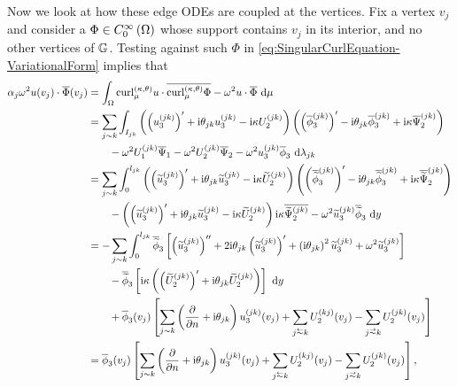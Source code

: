 Now we look at how these edge ODEs are coupled at the vertices.
Fix a vertex $v_j$ and consider a $\Phi\in C^{\infty}_{0}\left( \Omega \right)$ whose support contains $v_j$ in its interior, and no other vertices of $\mathbb{G}$.
Testing against such $\Phi$ in \eqref{eq:SingularCurlEquation-VariationalForm} implies that
\begin{align*}
	\alpha_j\omega^2 u(v_j)\cdot\overline{\Phi}(v_j)
	&= \integral{\ddom}{ \ktcurl{\ddmes}u\cdot\overline{\ktcurl{\ddmes}\Phi} - \omega^2 u\cdot\overline{\Phi} }{\ddmes} \\
	&= \sum_{j\con k}\integral{I_{jk}}{ \bracs{ \bracs{u_3^{(jk)}}' + \rmi\qm_{jk}u_3^{(jk)} - \rmi\wavenumber U_2^{(jk)}} \bracs{ \bracs{\overline{\phi}_3^{(jk)}}' - \rmi\qm_{jk}\overline{\phi}_3^{(jk)} + \rmi\wavenumber \overline{\Psi}_2^{(jk)}} \\
	&\qquad - \omega^2 U_1^{(jk)}\overline{\Psi}_1 - \omega^2 U_2^{(jk)}\overline{\Psi}_2 - \omega^2 u_3^{(jk)}\overline{\phi}_3 }{\lambda_{jk}} \\
	&= \sum_{j\con k}\int_0^{l_{jk}} \bracs{ \bracs{\widetilde{u}_3^{(jk)}}' + \rmi\qm_{jk}\widetilde{u}_3^{(jk)} - \rmi\wavenumber \widetilde{U}_2^{(jk)}} \bracs{ \bracs{\overline{\widetilde{\phi}}_3^{(jk)}}' - \rmi\qm_{jk}\overline{\widetilde{\phi}}_3^{(jk)} + \rmi\wavenumber \overline{\widetilde{\Psi}}_2^{(jk)}} \\
	&\qquad - \bracs{\bracs{\widetilde{u}_3^{(jk)}}' + \rmi\qm_{jk}\widetilde{u}_3^{(jk)} - \rmi\wavenumber \widetilde{U}_2^{(jk)}}\rmi\wavenumber\overline{\widetilde{\Psi}_2^{(jk)}} - \omega^2 \widetilde{u}_3^{(jk)}\overline{\widetilde{\phi}}_3 \ \md y \\
	&= -\sum_{j\con k}\int_0^{l_{jk}} \overline{\widetilde{\phi}}_3
	\sqbracs{ \bracs{\widetilde{u}_3^{(jk)}}'' + 2\rmi\qm_{jk}\bracs{\widetilde{u}_3^{(jk)}}' + \bracs{\rmi\qm_{jk}}^2\widetilde{u}_3^{(jk)} + \omega^2\widetilde{u}_3^{(jk)} } \\
	&\qquad - \overline{\widetilde{\phi}}_3\sqbracs{\rmi\wavenumber\bracs{ \bracs{\widetilde{U}_2^{(jk)}}' + \rmi\qm_{jk}\widetilde{U}_2^{(jk)} } } \ \md y \\
	&\qquad + \overline{\phi}_3(v_j)\sqbracs{ \sum_{j\con k}\bracs{\pdiff{}{n}+\rmi\qm_{jk}}u_3^{(jk)}(v_j) + \sum_{j\conRight k}U_2^{(kj)}(v_j) - \sum_{j\conLeft k}U_2^{(jk)}(v_j) } \\
	&= \overline{\phi}_3(v_j)\sqbracs{ \sum_{j\con k}\bracs{\pdiff{}{n}+\rmi\qm_{jk}}u_3^{(jk)}(v_j) + \sum_{j\conRight k}U_2^{(kj)}(v_j) - \sum_{j\conLeft k}U_2^{(jk)}(v_j) },
\end{align*}
